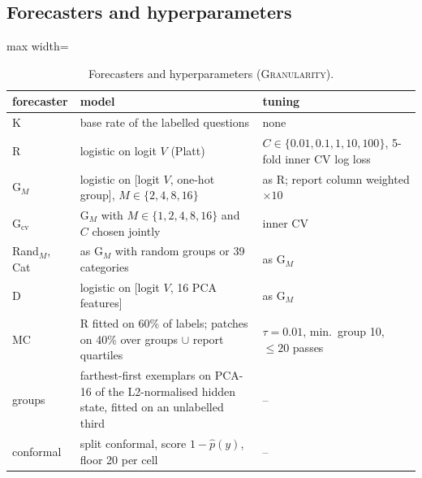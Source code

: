 \documentclass[twoside]{article}
\theoremstyle{definition}
\theoremstyle{remark}
\newcommand{\1}{\mathbf{1}}
\newcommand{\expname}[1]{\textsc{#1}}
\begin{document}
\subsection{Forecasters and hyperparameters}
\label{app:hyper}
\begin{table}[t]
\caption{Forecasters and hyperparameters (\expname{Granularity}).}
\centering\small
\begin{adjustbox}{max width=\textwidth}
\begin{tabular}{lll}
\toprule
forecaster & model & tuning\\
\midrule
K & base rate of the labelled questions & none\\
R & logistic on logit $V$ (Platt) & $C\in\{0.01,0.1,1,10,100\}$, 5-fold inner CV log loss\\
G$_M$ & logistic on [logit $V$, one-hot group], $M\in\{2,4,8,16\}$ & as R; report column weighted $\times10$\\
G$_{\mathrm{cv}}$ & G$_M$ with $M\in\{1,2,4,8,16\}$ and $C$ chosen jointly & inner CV\\
Rand$_M$, Cat & as G$_M$ with random groups or 39 categories & as G$_M$\\
D & logistic on [logit $V$, 16 PCA features] & as G$_M$\\
MC & R fitted on 60\% of labels; patches on 40\% over groups $\cup$ report quartiles & $\tau=0.01$, min.\ group 10, $\le20$ passes\\
\midrule
groups & farthest-first exemplars on PCA-16 of the L2-normalised hidden state, fitted on an unlabelled third & --\\
conformal & split conformal, score $1-\hat p(y)$, floor 20 per cell & --\\
\bottomrule
\end{tabular}
\end{adjustbox}
\end{table}
\end{document}

